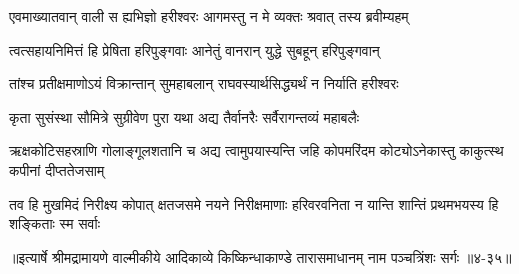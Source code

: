 \twolineshloka
{एवमाख्यातवान् वाली स ह्यभिज्ञो हरीश्वरः}
{आगमस्तु न मे व्यक्तः श्रवात् तस्य ब्रवीम्यहम्} %

\twolineshloka
{त्वत्सहायनिमित्तं हि प्रेषिता हरिपुङ्गवाः}
{आनेतुं वानरान् युद्धे सुबहून् हरिपुङ्गवान्} %

\twolineshloka
{तांश्च प्रतीक्षमाणोऽयं विक्रान्तान् सुमहाबलान्}
{राघवस्यार्थसिद्ध्यर्थं न निर्याति हरीश्वरः} %

\twolineshloka
{कृता सुसंस्था सौमित्रे सुग्रीवेण पुरा यथा}
{अद्य तैर्वानरैः सर्वैरागन्तव्यं महाबलैः} %

\threelineshloka
{ऋक्षकोटिसहस्राणि गोलाङ्गूलशतानि च}
{अद्य त्वामुपयास्यन्ति जहि कोपमरिंदम}
{कोट्योऽनेकास्तु काकुत्स्थ कपीनां दीप्ततेजसाम्} %

\twolineshloka
{तव हि मुखमिदं निरीक्ष्य कोपात् क्षतजसमे नयने निरीक्षमाणाः}
{हरिवरवनिता न यान्ति शान्तिं प्रथमभयस्य हि शङ्किताः स्म सर्वाः} %


॥इत्यार्षे श्रीमद्रामायणे वाल्मीकीये आदिकाव्ये किष्किन्धाकाण्डे तारासमाधानम् नाम पञ्चत्रिंशः सर्गः ॥४-३५॥
